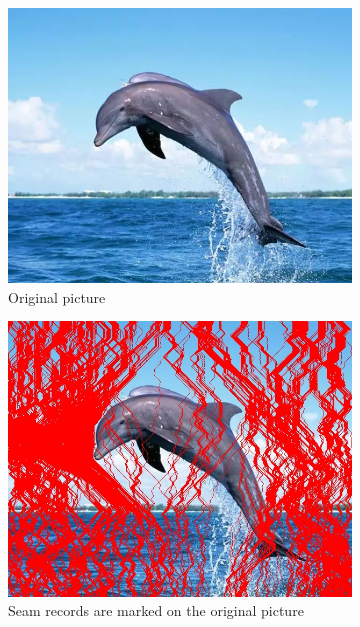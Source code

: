 \documentclass[final]{cvpr}
\begin{document}
\begin{figure}[htb]
\begin{center}
\begin{subfigure}[t]{0.48\linewidth}
    \includegraphics[width=\textwidth]{dolphin.jpg}
    \caption{Original picture}
\end{subfigure}
\begin{subfigure}[t]{0.48\linewidth}
    \includegraphics[width=\textwidth]{dolpin_seam_carving_records.jpg}
    \caption{Seam records are marked on the original picture}
\end{subfigure}
\begin{subfigure}[b]{0.24\linewidth}

\end{subfigure}
\end{center}
\end{figure}
\end{document}
